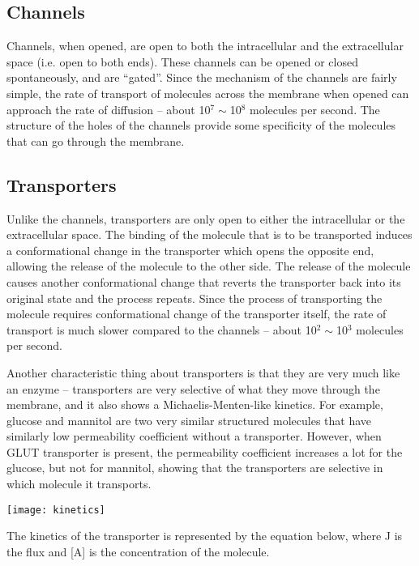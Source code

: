 \documentclass[a4paper, 12pt]{report}
\begin{document}
\subsection{Channels}

Channels, when opened, are open to both the intracellular and the extracellular space (i.e. open to both ends).
These channels can be opened or closed spontaneously, and are ``gated''.
Since the mechanism of the channels are fairly simple, the rate of transport of molecules across the membrane when opened can approach the rate of diffusion -- about 10$^7\sim$10$^8$ molecules per second.
The structure of the holes of the channels provide some specificity of the molecules that can go through the membrane.

\subsection{Transporters}

Unlike the channels, transporters are only open to either the intracellular or the extracellular space.
The binding of the molecule that is to be transported induces a conformational change in the transporter which opens the opposite end, allowing the release of the molecule to the other side.
The release of the molecule causes another conformational change that reverts the transporter back into its original state and the process repeats.
Since the process of transporting the molecule requires conformational change of the transporter itself, the rate of transport is much slower compared to the channels -- about 10$^2\sim$10$^3$ molecules per second.

Another characteristic thing about transporters is that they are very much like an enzyme -- transporters are very selective of what they move through the membrane, and it also shows a Michaelis-Menten-like kinetics.
For example, glucose and mannitol are two very similar structured molecules that have similarly low permeability coefficient without a transporter.
However, when GLUT transporter is present, the permeability coefficient increases a lot for the glucose, but not for mannitol, showing that the transporters are selective in which molecule it transports.

\begin{center}
\texttt{[image: kinetics]}
\end{center}

The kinetics of the transporter is represented by the equation below, where J is the flux and [A] is the concentration of the molecule.
\end{document}
